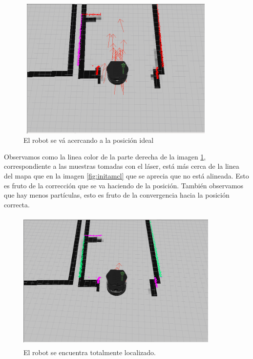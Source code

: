 \begin{figure}[hbtp]
  \begin{center}
    \includegraphics[width=10cm,height=7cm]{img/cap3/actamcl}
  \end{center}
  \caption{El robot se vá acercando a la posición ideal}
  \label{fig:actamcl}
\end{figure}

Observamos como la linea color de la parte derecha de la imagen \ref{fig:actamcl}, correspondiente a las muestras tomadas con el láser, está más cerca de la linea del mapa que en la imagen \ref{fig:initamcl} que se aprecia que no está alineada. Esto es fruto de la corrección que se va haciendo de la posición. También observamos que hay menos partículas, esto es fruto de la convergencia hacia la posición correcta.

\begin{figure}[hbtp]
  \begin{center}
    \includegraphics[width=10cm,height=7cm]{img/cap3/finamcl}
  \end{center}
  \caption{El robot se encuentra totalmente localizado.}
  \label{fig:finamcl}
\end{figure}

